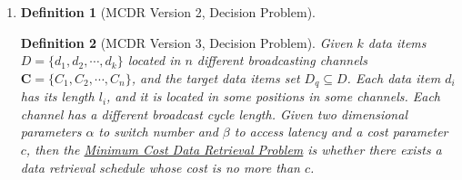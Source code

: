 \documentclass[12pt,a4paper]{article}
\makeatletter
\newtheorem*{solution}{Solution}
\newtheorem{definition}{Definition}
\theoremstyle{definition}
\renewenvironment{solution}[1][Solution] {\par\pushQED{\qed}\normalfont\topsep6\p@\@plus6\p@\relax\trivlist\item[\hskip\labelsep\bfseries#1\@addpunct{.}]\ignorespaces}{\popQED\endtrivlist\@endpefalse} \makeatother
\makeatother
\begin{document}
\begin{enumerate}
\begin{solution}
\begin{enumerate}
\begin{definition}[MCDR Version 2, Decision Problem]
\end{definition}
\begin{definition}[MCDR Version 3, Decision Problem]
Given $k$ data items $D = \{d_1, d_2,\cdots, d_k\}$ located in $n$ different broadcasting channels $\mathbf{C}=\{C_1, C_2, \cdots, C_n\}$, and the target data items set $D_q \subseteq D$. Each data item $d_i$ has its length $l_i$, and it is located in some positions in some channels. Each channel has a different broadcast cycle length. Given two dimensional parameters $\alpha$ to switch number and $\beta$ to access latency and a cost parameter $c$, then the \underline{Minimum Cost Data Retrieval Problem} is whether there exists a data retrieval schedule whose {\color{red}cost is no more than $c$}.
\end{definition}
\end{enumerate}
\end{solution}
\end{enumerate}

\end{document}
